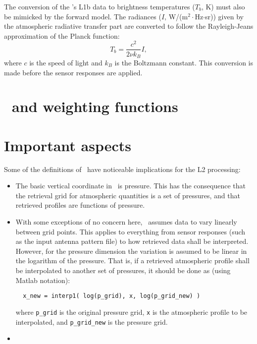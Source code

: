 The conversion of the \smr's L1b data to brightness temperatures ($T_b$, K)
must also be mimicked by the forward model. The radiances ($I$,
W/(m$^2\cdot$Hz$\cdot$sr)) given by the atmospheric radiative transfer part are
converted to follow the Rayleigh-Jeans approximation of the Planck function:
\begin{equation}
  \label{eq:i2tb}
  T_b = \frac{c^2}{2\nu k_B} I,
\end{equation}
where $c$ is the speed of light and $k_B$ is the Boltzmann constant. This
conversion is made before the sensor responses are applied.



\section{\ARTS\ and weighting functions}
\label{sec:arts:wfuns}
%



\section{Important aspects}
\label{sec:arts:aspects}
%
Some of the definitions of \ARTS\ have noticeable implications for the
L2 processing:
\begin{itemize}
\item The basic vertical coordinate in \ARTS\ is pressure. This has the
  consequence that the retrieval grid for atmospheric quantities is a set of
  pressures, and that retrieved profiles are functions of pressure.
\item With some exceptions of no concern here, \ARTS\ assumes data to vary
  linearly between grid points. This applies to everything from sensor responses
  (such as the input antenna pattern file) to how retrieved data shall be
  interpreted. However, for the pressure dimension the variation is assumed to
  be linear in the logarithm of the pressure. That is, if a retrieved
  atmospheric profile shall be interpolated to another set of pressures, it
  should be done as (using Matlab notation):
\begin{verbatim}
  x_new = interp1( log(p_grid), x, log(p_grid_new) )
\end{verbatim}
where \verb|p_grid| is the original pressure grid, \verb|x| is the atmospheric
profile to be interpolated, and \verb|p_grid_new| is the pressure grid.
\item {}
\end{itemize}



